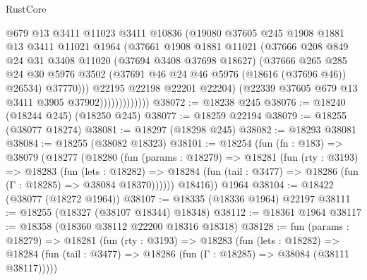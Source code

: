 \begin{lexlean}{RustCore}
\begin{coremodule}
                            @679
                            @13
                            @3411
                            @11023
                            @3411
                            @10836
                            (@19080
                              @37605
                              @245
                              @1908
                              @1881
                              @13
                              @3411
                              @11021
                              @1964
                              (@37661
                                @1908
                                @1881
                                @11021
                                (@37666
                                  @208
                                  @849
                                  @24
                                  @31
                                  @3408
                                  @11020
                                  (@37694 @3408 @37698 @18627)
                                  (@37666
                                    @265
                                    @285
                                    @24
                                    @30
                                    @5976
                                    @3502
                                    (@37691 @46 @24 @46 @5976 (@18616 (@37696 @46)) @26534)
                                    @37770)))
                              @22195
                              @22198
                              @22201
                              @22204)
                            (@22339 @37605 @679 @13 @3411 @3905 @37902)))))))))))))
@38072 := @18238 @245
@38076 := @18240 (@18244 @245) (@18250 @245)
@38077 := @18259 @22194
@38079 := @18255 (@38077 @18274)
@38081 := @18297 (@18298 @245)
@38082 := @18293 @38081
@38084 := @18255 (@38082 @18323)
@38101 := @18254
    (fun (fn : @183) =>
    @38079
      (@18277
        (@18280
          (fun (params : @18279) =>
          @18281
            (fun (rty : @3193) =>
            @18283
              (fun (lets : @18282) =>
              @18284 (fun (tail : @3477) => @18286 (fun (Γ : @18285) => @38084 @18370))))))
        @18416))
    @1964
@38104 := @18422 (@38077 (@18272 @1964))
@38107 := @18335 (@18336 @1964) @22197
@38111 := @18255 (@18327 (@38107 @18344) @18348)
@38112 := @18361 @1964
@38117 := @18358 (@18360 @38112 @22200 @18316 @18318)
@38128 := fun (params : @18279) =>
  @18281
    (fun (rty : @3193) =>
    @18283
      (fun (lets : @18282) =>
      @18284 (fun (tail : @3477) => @18286 (fun (Γ : @18285) => @38084 (@38111 @38117)))))

\end{coremodule}
\end{lexlean}
